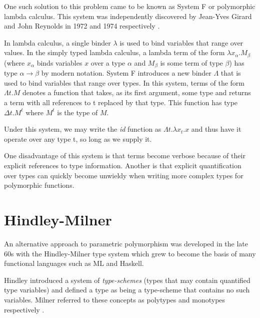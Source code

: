           One such solution to this problem came to be known as System F
          or polymorphic lambda calculus. This system was independently
          discovered by Jean-Yves Girard and John Reynolds in 1972 and 1974
          respectively \cite{Girard1972,reynolds1974}.
      
          In lambda calculus, a single binder $\lambda$ is used to bind variables
          that range over values. In the simply typed lambda calculus, a
          lambda term of the form $\lambda x_{\alpha}.M_{\beta}$ (where
          $x_{\alpha}$ binds variables $x$ over a type $\alpha$ and
          $M_{\beta}$ is some term of type $\beta $) has type
          $\alpha\to\beta$ by modern notation. System F introduces a new
          binder $\Lambda$ that is used to bind variables that range over
          types. In this system, terms of the form $\Lambda t.M$ denotes a
          function that takes, as its first argument, some type and returns a
          term with all references to t replaced by that type. This function
          has type $\Delta t.M^{t}$ where $M^t$ is the type of $M$.
      
          Under this system, we may write the \emph{id} function as $\Lambda t
          . \lambda x_t . x$ and thus have it operate over any type t,
          so long as we supply it.
      
          One disadvantage of this system is that terms become verbose
          because of their explicit references to type
          information. Another is that explicit quantification over
          types can quickly become unwieldy when writing more complex
          types for polymorphic functions.

          \section{Hindley-Milner}
            An alternative approach to parametric polymorphism was
            developed in the late 60s with the Hindley-Milner type
            system which grew to become the basis of many functional
            languages such as ML and Haskell.
                        
            Hindley introduced a system of \textit{type-schemes}
            \cite{hindley1969} (types that may contain quantified type
            variables) and defined a type as being a type-scheme that
            contains no such variables. Milner referred to these
            concepts as polytypes and monotypes respectively
            \cite{milner1978}. 
            
